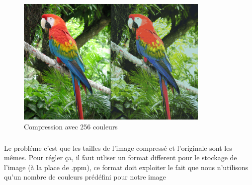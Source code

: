 \documentclass{article}
\begin{document}
\begin{figure}[H]
   \centering
   \includegraphics[width=25em]{comp256.png}
   \caption{Compression avec 256 couleurs}
\end{figure}

\subsubsection{ }
Le probléme c'est que les tailles de l'image compressé et l'originale
sont les mêmes. Pour régler ça, il faut utliser un format different pour le
stockage de l'image (à la place de .ppm), ce format doit exploiter le fait que
nous n'utilisons qu'un nombre de couleurs prédéfini pour notre image 
\end{document}
